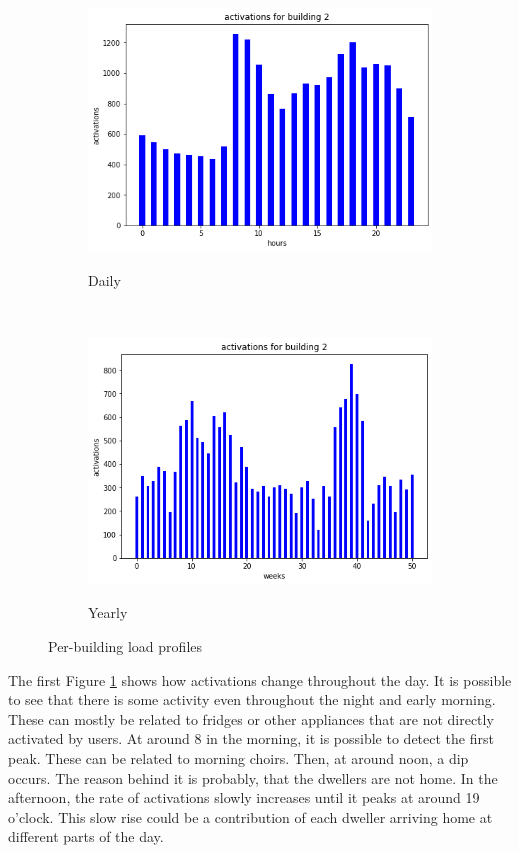 \begin{figure}[H]
	\begin{subfigure}{.5\textwidth}
		\caption{Daily}
		\includegraphics[width=1\linewidth]{../Figures/LPS/SLPdaily2.png}
		\label{fig:SLPdaily2}
	\end{subfigure}%
	~ 
	\begin{subfigure}{.5\textwidth}
		\caption{Yearly}
		\includegraphics[width=1\linewidth]{../Figures/LPS/SLPyearly2.png}
		\label{fig:SLPyearly2}
	\end{subfigure}%
	\label{fig:SLP}
	\caption{Per-building load profiles}
\end{figure}

The first Figure \ref{fig:SLPdaily2} shows how activations change throughout the day.
It is possible to see that there is some activity even throughout the night and early morning.
These can mostly be related to fridges or other appliances that are not directly activated by users.
At around 8 in the morning, it is possible to detect the first peak. 
These can be related to morning choirs. 
Then, at around noon, a dip occurs. 
The reason behind it is probably, that the dwellers are not home.
In the afternoon, the rate of activations slowly increases until it peaks at around 19 o'clock. 
This slow rise could be a contribution of each dweller arriving home at different parts of the day.

